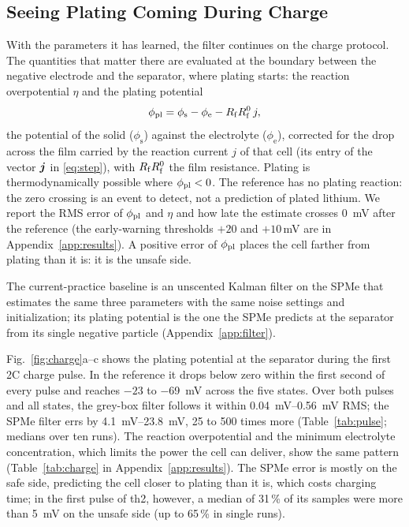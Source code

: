 \documentclass[journal]{IEEEtran}
\begin{document}
\subsection{Seeing Plating Coming During Charge}\label{sec:charge}
With the parameters it has learned, the filter continues on the charge protocol. The quantities that matter there are evaluated at the boundary between the negative electrode and the separator, where plating starts: the reaction overpotential $\eta$ and the plating potential
\begin{equation}
\phi_{\mathrm{pl}}=\phi_{\mathrm s}-\phi_{\mathrm e}-R_{\mathrm{f}} R^{0}_{\mathrm f}\,j,
\label{eq:phipl}
\end{equation}
the potential of the solid ($\phi_{\mathrm s}$) against the electrolyte ($\phi_{\mathrm e}$), corrected for the drop across the film carried by the reaction current $j$ of that cell (its entry of the vector $\bm{j}$ in \eqref{eq:step}), with $R_{\mathrm{f}} R^{0}_{\mathrm f}$ the film resistance. Plating is thermodynamically possible where $\phi_{\mathrm{pl}}<0$\cite{arora1999}. The reference has no plating reaction: the zero crossing is an event to detect, not a prediction of plated lithium. We report the RMS error of $\phi_{\mathrm{pl}}$ and $\eta$ and how late the estimate crosses \SI{0}{\milli\volt} after the reference (the early-warning thresholds $+20$ and $+10$\,mV are in Appendix~\ref{app:results}). A positive error of $\phi_{\mathrm{pl}}$ places the cell farther from plating than it is: it is the unsafe side.

The current-practice baseline is an unscented Kalman filter on the SPMe that estimates the same three parameters with the same noise settings and initialization; its plating potential is the one the SPMe predicts at the separator from its single negative particle (Appendix~\ref{app:filter}).

Fig.~\ref{fig:charge}a--c shows the plating potential at the separator during the first 2C charge pulse. In the reference it drops below zero within the first second of every pulse and reaches $-23$ to \SI{-69}{\milli\volt} across the five states. Over both pulses and all states, the grey-box filter follows it within \SIrange{0.04}{0.56}{\milli\volt} RMS; the SPMe filter errs by \SIrange{4.1}{23.8}{\milli\volt}, 25 to 500 times more (Table~\ref{tab:pulse}; medians over ten runs). The reaction overpotential and the minimum electrolyte concentration, which limits the power the cell can deliver, show the same pattern (Table~\ref{tab:charge} in Appendix~\ref{app:results}). The SPMe error is mostly on the safe side, predicting the cell closer to plating than it is, which costs charging time; in the first pulse of th2, however, a median of 31\,\% of its samples were more than \SI{5}{\milli\volt} on the unsafe side (up to 65\,\% in single runs).
\end{document}
